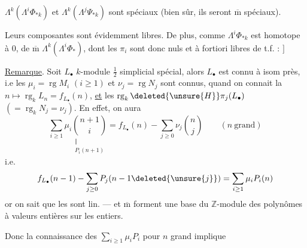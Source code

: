 $\Lambda^k(\Lambda^i\Phi_{*k})$ et $\Lambda^k(\Lambda^j\Psi_{*k})$ sont spéciaux (bien sûr, ils seront $\overline{\mathrm m}$  spéciaux).

Leurs composantes sont évidemment libres. De plus, comme $\Lambda^i\Phi_{*k}$ est homotope à $0$, de $\overline{\mathrm m}$ $\Lambda^k(\Lambda^i\Phi_*)$, dont les $\pi_i$ sont donc nuls et à fortiori libres de t.f. :
\hfill $]$

\uline{Remarque}. Soit $L_{\bullet}$ $k$-module $\frac12$ simplicial  spécial, alors $L_{\bullet}$ est connu à isom près, i.e les $\mu_i=\operatorname{rg}M_i$ $(i\geq1)$ et $\nu_j=\operatorname{rg}N_j$  sont connus, quand on connait la   $n\longmapsto\operatorname{rg}_k L_n=f_{L_{\bullet}}(n)$,  \uline{et} les $\operatorname{rg}_k\deleted{\unsure{H}}\pi_j(L_{\bullet})$ $(=\operatorname{rg}_k N_j=\nu_j)$. En effet, on aura
\[
\sum_{i\geq1}\mu_i\underset{\substack{\Vert\\P_i(n+1)}}{\binom{n+1}i}
=f_{L_{\bullet}}(n)-\sum_{j\geq0}\nu_j\binom n j
\qquad(n\ \text{grand})
\]
 i.e.
\[
f_{L_{\bullet}}(n-1)-\sum_{j\geq0}P_j(n-1\deleted{\unsure{j}})=\sum_{i\geq1}\mu_i P_i(n)
\]
or on sait que les   sont  lin.  --- et $\overline{\mathrm m}$ forment une base du $\mathbb Z$-module des polynômes à  valeurs entières sur les entiers.

Donc la connaissance des $\sum_{i\geq1}\mu_iP_i$ pour $n$ grand implique
